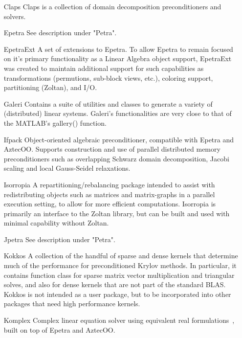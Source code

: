 \begin{itemize}
\item[Claps]
Claps is a collection of domain decomposition preconditioners and
solvers.

\item[Epetra]
See description under "Petra".

\item[EpetraExt]
A set of extensions to Epetra. To allow Epetra to remain focused on
it's primary functionality as a Linear Algebra object support,
EpetraExt was created to maintain additional support for such
capabilities as transformations (permutions, sub-block views, etc.),
coloring support, partitioning (Zoltan), and I/O.
 
\item[Galeri]
Contains a suite of utilities and classes to generate a variety of
(distributed) linear systems. Galeri's functionalities are very close
to that of the MATLAB's gallery() function.

\item[Ifpack] 
Object-oriented algebraic preconditioner, compatible with 
Epetra and AztecOO.  Supports construction and use of parallel
distributed memory preconditioners such as overlapping Schwarz domain
decomposition, Jacobi scaling and local Gauss-Seidel relaxations.

\item[Isorropia]
A repartitioning/rebalancing package intended to assist with
redistributing objects such as matrices and matrix-graphs in a parallel
execution setting, to allow for more efficient computations.
Isorropia is primarily an interface to the Zoltan library, but can
be built and used with minimal capability without Zoltan. 

\item[Jpetra]
See description under "Petra".

\item[Kokkos]
A collection of the handful of sparse and dense kernels that determine
much of the performance for preconditioned Krylov methods. In particular,
it contains function class for sparse matrix vector multiplication and
triangular solves, and also for dense kernels that are not part of the
standard BLAS.  Kokkos is not intended as a user package, but to be
incorporated into other packages that need high performance kernels.

\item[Komplex] 
Complex linear equation solver using equivalent real 
formulations~\cite{DayHero2000}, built on top of Epetra and AztecOO.


\end{itemize}
